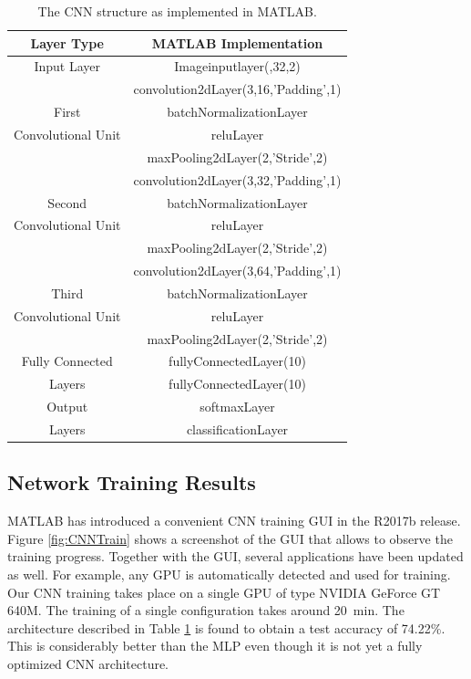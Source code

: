 \begin{table}[h]
	\begin{center}
		\begin{tabular}{||c | c||}
			\hline
			\textbf{Layer Type}& \textbf{MATLAB Implementation} \\ [0.5ex]
			\hline
			Input Layer& Imageinputlayer(\lbrack32,32,2\rbrack)\\
			\hline
			 & convolution2dLayer(3,16,'Padding',1) \\
			First& batchNormalizationLayer\\
			Convolutional Unit& reluLayer\\
			 & maxPooling2dLayer(2,'Stride',2)\\
			\hline
			 & convolution2dLayer(3,32,'Padding',1)\\
			Second& batchNormalizationLayer\\
			Convolutional Unit& reluLayer\\
			 & maxPooling2dLayer(2,'Stride',2)\\
			\hline
			 & convolution2dLayer(3,64,'Padding',1)\\
			Third& batchNormalizationLayer\\
			Convolutional Unit& reluLayer\\
			& maxPooling2dLayer(2,'Stride',2)\\
			\hline
			Fully Connected& fullyConnectedLayer(10)\\
			Layers& fullyConnectedLayer(10)\\
			\hline
			Output& softmaxLayer\\
			Layers& classificationLayer\\
			\hline
			
		\end{tabular}
		\caption{The CNN structure as implemented in MATLAB.}
		\label{Tab:CNNStructure}
	\end{center}
\end{table}
\FloatBarrier
\subsection{Network Training Results}

MATLAB has introduced a convenient CNN training GUI in the R2017b release. Figure \ref{fig:CNNTrain} shows a screenshot of the GUI that allows to observe the training progress. Together with the GUI, several applications have been updated as well. For example, any GPU is automatically detected and used for training. Our CNN training takes place on a single GPU of type NVIDIA GeForce GT 640M. The training of a single configuration takes around \SI{20}{\minute}. The architecture described in Table \ref{Tab:CNNStructure} is found to obtain a test accuracy of 74.22\%. This is considerably better than the MLP even though it is not yet a fully optimized CNN architecture.

